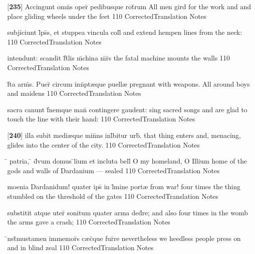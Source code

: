 \latline
  {[\textbf{235}] Accingunt omn\={}s oper\={\macron {\i}} pedibusque rot\={}rum}
  { All men gird for the work and and place gliding wheels under the feet  }
  {110}
  { CorrectedTranslation }
  { Notes }


\latline
  {subjiciunt l\={}ps\={}s, et stuppea vincula coll\={}}
  { and extend hempen lines from the neck: }
  {110}
  { CorrectedTranslation }
  { Notes }


\latline
  {intendunt: scandit f\={}t\={}lis m\={}china m\={}r\={}s}
  { the fatal machine mounts the walls  }
  {110}
  { CorrectedTranslation }
  { Notes }


\latline
  {f\={}ta arm\={\macron {\i}}s.  Puer\={\macron {\i}} circum inn\={}pt{\ae}que puell{\ae}}
  { pregnant with weapons.  All around boys and maidens }
  {110}
  { CorrectedTranslation }
  { Notes }


\latline
  {sacra canunt f\={}nemque man\={} contingere gaudent:}
  { sing sacred songs and are glad to touch the line with their hand: }
  {110}
  { CorrectedTranslation }
  { Notes }


\latline
  {[\textbf{240}] illa subit medi{\ae}que min\={}ns inl\={}bitur urb\={\macron {\i}}.}
  { that thing enters and, menacing, glides into the center of the city. }
  {110}
  { CorrectedTranslation }
  { Notes }


\latline
  {\={} patria, \={} d\={\macron {\i}}vum domus \={}lium et incluta bell\={}}
  { O my homeland, O Illium home of the gods and walls of Dardanium  --- sealed}
  {110}
  { CorrectedTranslation }
  { Notes }


\latline
  {moenia Dardanidum! quater ips\={} in l\={\macron {\i}}mine port{\ae}}
  { from war!  four times the thing stumbled on the threshold of the gates }
  {110}
  { CorrectedTranslation }
  { Notes }


\latline
  {substitit atque uter\={} sonitum quater arma ded\={}re;}
  { and also four times in the womb the arms gave a crash; }
  {110}
  { CorrectedTranslation }
  { Notes }


\latline
  {\={\macron {\i}}nst\={}mustamen immemor\={}s c{\ae}c\={\macron {\i}}que fur\={}re}
  { nevertheless we heedless people press on and in blind zeal }
  {110}
  { CorrectedTranslation }
  { Notes }


